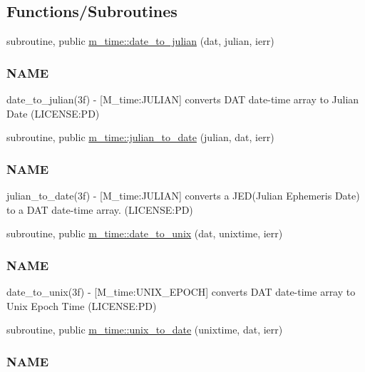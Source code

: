 \subsection*{Functions/\+Subroutines}
\begin{DoxyCompactItemize}
\item 
subroutine, public \mbox{\hyperlink{namespacem__time_acfdc970b4154b0c15bd33727636e3992}{m\+\_\+time\+::date\+\_\+to\+\_\+julian}} (dat, julian, ierr)
\begin{DoxyCompactList}\small\item\em \subsubsection*{N\+A\+ME}

date\+\_\+to\+\_\+julian(3f) -\/ \mbox{[}M\+\_\+time\+:J\+U\+L\+I\+AN\mbox{]} converts D\+AT date-\/time array to Julian Date (L\+I\+C\+E\+N\+SE\+:PD) \end{DoxyCompactList}\item 
subroutine, public \mbox{\hyperlink{namespacem__time_abb44cf18cd0a3e420c20469efb056203}{m\+\_\+time\+::julian\+\_\+to\+\_\+date}} (julian, dat, ierr)
\begin{DoxyCompactList}\small\item\em \subsubsection*{N\+A\+ME}

julian\+\_\+to\+\_\+date(3f) -\/ \mbox{[}M\+\_\+time\+:J\+U\+L\+I\+AN\mbox{]} converts a J\+ED(Julian Ephemeris Date) to a D\+AT date-\/time array. (L\+I\+C\+E\+N\+SE\+:PD) \end{DoxyCompactList}\item 
subroutine, public \mbox{\hyperlink{namespacem__time_aed245c691853279ebf0ce899dec9caa9}{m\+\_\+time\+::date\+\_\+to\+\_\+unix}} (dat, unixtime, ierr)
\begin{DoxyCompactList}\small\item\em \subsubsection*{N\+A\+ME}

date\+\_\+to\+\_\+unix(3f) -\/ \mbox{[}M\+\_\+time\+:U\+N\+I\+X\+\_\+\+E\+P\+O\+CH\mbox{]} converts D\+AT date-\/time array to Unix Epoch Time (L\+I\+C\+E\+N\+SE\+:PD) \end{DoxyCompactList}\item 
subroutine, public \mbox{\hyperlink{namespacem__time_acc62ada23f8fa2fe67b428702fbcbf1c}{m\+\_\+time\+::unix\+\_\+to\+\_\+date}} (unixtime, dat, ierr)
\begin{DoxyCompactList}\small\item\em \subsubsection*{N\+A\+ME}


\end{DoxyCompactList}
\end{DoxyCompactItemize}
